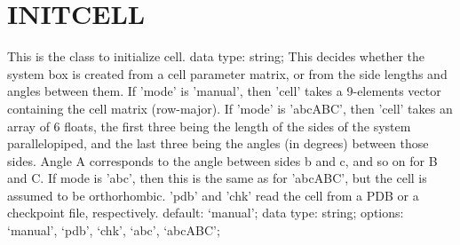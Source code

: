 \section{INITCELL}
\label{INITCELL}
\begin{ipifield}{}%
{This is the class to initialize cell.}%
{data type: string; }%
{%
{This decides whether the system box is created from a cell parameter matrix, or from the side lengths and angles between them. If 'mode' is 'manual', then 'cell' takes a 9-elements vector containing the cell matrix (row-major). If 'mode' is 'abcABC', then 'cell' takes an array of 6 floats, the first three being the length of the sides of the system parallelopiped, and the last three being the angles (in degrees) between those sides. Angle A corresponds to the angle between sides b and c, and so on for B and C. If mode is 'abc', then this is the same as for 'abcABC', but the cell is assumed to be orthorhombic. 'pdb' and 'chk' read the cell from a PDB or a checkpoint file, respectively.}%
{default: `manual'; data type: string; options: `manual', `pdb', `chk', `abc', `abcABC'; }%
}
\end{ipifield}
